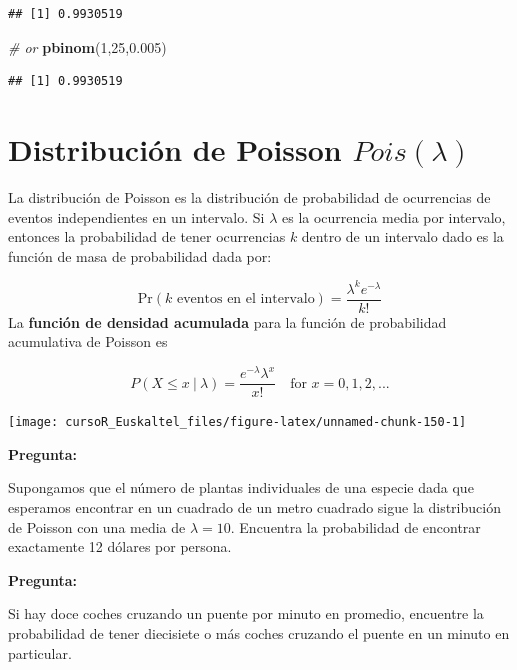 \documentclass[]{book}
\newenvironment{Shaded}{\begin{snugshade}}{\end{snugshade}}
\newcommand{\KeywordTok}[1]{\textcolor[rgb]{0.13,0.29,0.53}{\textbf{#1}}}
\newcommand{\DecValTok}[1]{\textcolor[rgb]{0.00,0.00,0.81}{#1}}
\newcommand{\FloatTok}[1]{\textcolor[rgb]{0.00,0.00,0.81}{#1}}
\newcommand{\CommentTok}[1]{\textcolor[rgb]{0.56,0.35,0.01}{\textit{#1}}}
\newcommand{\NormalTok}[1]{#1}
\begin{document}
\begin{verbatim}
## [1] 0.9930519
\end{verbatim}

\begin{Shaded}
\begin{Highlighting}[]
\CommentTok{# or}
\KeywordTok{pbinom}\NormalTok{(}\DecValTok{1}\NormalTok{,}\DecValTok{25}\NormalTok{,}\FloatTok{0.005}\NormalTok{)}
\end{Highlighting}
\end{Shaded}

\begin{verbatim}
## [1] 0.9930519
\end{verbatim}

\section{\texorpdfstring{Distribución de Poisson
\(Pois(\lambda)\)}{Distribución de Poisson Pois(\textbackslash{}lambda)}}\label{distribucion-de-poisson-poislambda}

La distribución de Poisson es la distribución de probabilidad de
ocurrencias de eventos independientes en un intervalo. Si \(\lambda\) es
la ocurrencia media por intervalo, entonces la probabilidad de tener
ocurrencias \(k\) dentro de un intervalo dado es la función de masa de
probabilidad dada por:

\[
\mbox{Pr}(\mbox{$k$ eventos en el intervalo}) = \frac{\lambda^k e^{-\lambda}}{k!}
\] La \textbf{función de densidad acumulada} para la función de
probabilidad acumulativa de Poisson es

\[
P(X\leq x ~|~\lambda ) = \frac{e^{-\lambda} \lambda ^x}{x!}\quad \mbox{for $x=0,1,2,...$}
\]

\begin{center}\texttt{[image: cursoR\_Euskaltel\_files/figure-latex/unnamed-chunk-150-1]} \end{center}

\textbf{Pregunta:}

Supongamos que el número de plantas individuales de una especie dada que
esperamos encontrar en un cuadrado de un metro cuadrado sigue la
distribución de Poisson con una media de \(\lambda= 10\). Encuentra la
probabilidad de encontrar exactamente 12 dólares por persona.

\textbf{Pregunta:}

Si hay doce coches cruzando un puente por minuto en promedio, encuentre
la probabilidad de tener diecisiete o más coches cruzando el puente en
un minuto en particular.
\end{document}
